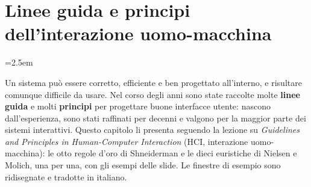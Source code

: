 \chapter{Linee guida e principi dell'interazione uomo-macchina}
\label{cap:hci}
\emergencystretch=2.5em

Un sistema può essere corretto, efficiente e ben progettato all'interno, e risultare comunque difficile da usare. Nel
corso degli anni sono state raccolte molte \textbf{linee guida} e molti \textbf{principi} per progettare buone interfacce
utente: nascono dall'esperienza, sono stati raffinati per decenni e valgono per la maggior parte dei sistemi
interattivi. Questo capitolo li presenta seguendo la lezione su \textit{Guidelines and Principles in Human-Computer
Interaction} (HCI, interazione uomo-macchina): le otto regole d'oro di Shneiderman e le dieci euristiche di Nielsen e
Molich, una per una, con gli esempi delle slide. Le finestre di esempio sono ridisegnate e tradotte in italiano.

\newcommand{\bottone}[2][swteal]{\tikz[baseline=(b.base)]\node[rectangle, rounded corners=1pt, fill=#1, text=white,
  font=\tiny\Lato\bfseries, inner sep=2.5pt, minimum width=1.2cm] (b) {#2};}
\newcommand{\bottonechiaro}[1]{\tikz[baseline=(b.base)]\node[rectangle, rounded corners=1pt, draw=swgray, fill=white,
  text=black!80, font=\tiny\Lato, inner sep=2.5pt, minimum width=1.2cm] (b) {#1};}
\newcommand{\pulsanti}[1]{\par\smallskip{\hfill #1\par}}
\newcommand{\campo}[2][2.2cm]{\tikz[baseline=(c.base)]\node[rectangle, draw=swgray!70, fill=white, font=\tiny\Lato,
  minimum width=#1, text width=#1-6pt, inner sep=2.5pt, align=left] (c) {#2};}
\newcommand{\casella}{\tikz[baseline=-0.4ex]\draw[line width=0.4pt, draw=swgray] (0,-0.03) rectangle (0.17,0.14);}
\newcommand{\male}{\tikz[baseline=(v.base)]\node[chip=swred] (v) {da evitare};}
\newcommand{\bene}{\tikz[baseline=(v.base)]\node[chip=swgreen] (v) {meglio};}
\newcommand{\benissimo}{\tikz[baseline=(v.base)]\node[chip=swgreen!70!black] (v) {ancora meglio};}

